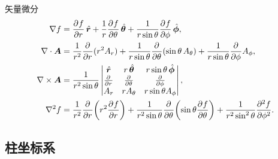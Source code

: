 矢量微分
\begin{align}
    \nabla f&=\pv fr\uvec r+\frac1r\pv f\theta\uvec\theta+\frac1{r\sin\theta}\pv f\phi\uvec\phi,\\
    \div\bm A&=\frac1{r^2}\pp r(r^2A_r)+\frac1{r\sin\theta}\pp\theta(\sin\theta\,A_\theta)+\frac1{r\sin\theta}\pp\phi A_\phi,\\
    \curl\bm A&=\frac1{r^2\sin\theta}
    \begin{vmatrix}
        \uvec r&r\uvec\theta&r\sin\theta\uvec\phi\\
        \pp r&\pp\theta&\pp\phi\\
        A_r&rA_\theta&r\sin\theta A_\phi
    \end{vmatrix},\\
    \lap f&=\frac1{r^2}\pp r\biggkh{r^2\pv fr}+\frac1{r^2\sin\theta}\pp\theta\biggkh{\sin\theta\pv f\theta}+\frac1{r^2\sin^2\theta}\pv[2]f\phi.
\end{align}

\subsection{柱坐标系}

